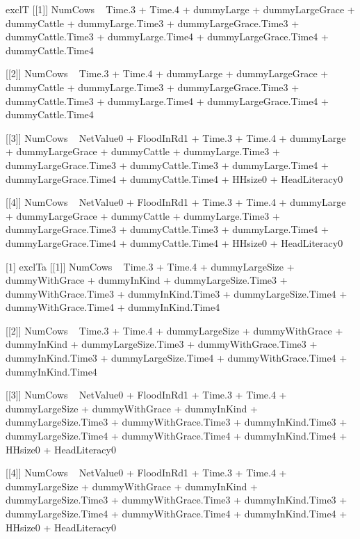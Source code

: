 \begin{Schunk}
\begin{Soutput}
[1] exclT
[[1]]
NumCows ~ Time.3 + Time.4 + dummyLarge + dummyLargeGrace + dummyCattle + 
    dummyLarge.Time3 + dummyLargeGrace.Time3 + dummyCattle.Time3 + 
    dummyLarge.Time4 + dummyLargeGrace.Time4 + dummyCattle.Time4

[[2]]
NumCows ~ Time.3 + Time.4 + dummyLarge + dummyLargeGrace + dummyCattle + 
    dummyLarge.Time3 + dummyLargeGrace.Time3 + dummyCattle.Time3 + 
    dummyLarge.Time4 + dummyLargeGrace.Time4 + dummyCattle.Time4

[[3]]
NumCows ~ NetValue0 + FloodInRd1 + Time.3 + Time.4 + dummyLarge + 
    dummyLargeGrace + dummyCattle + dummyLarge.Time3 + dummyLargeGrace.Time3 + 
    dummyCattle.Time3 + dummyLarge.Time4 + dummyLargeGrace.Time4 + 
    dummyCattle.Time4 + HHsize0 + HeadLiteracy0

[[4]]
NumCows ~ NetValue0 + FloodInRd1 + Time.3 + Time.4 + dummyLarge + 
    dummyLargeGrace + dummyCattle + dummyLarge.Time3 + dummyLargeGrace.Time3 + 
    dummyCattle.Time3 + dummyLarge.Time4 + dummyLargeGrace.Time4 + 
    dummyCattle.Time4 + HHsize0 + HeadLiteracy0

[1] exclTa
[[1]]
NumCows ~ Time.3 + Time.4 + dummyLargeSize + dummyWithGrace + 
    dummyInKind + dummyLargeSize.Time3 + dummyWithGrace.Time3 + 
    dummyInKind.Time3 + dummyLargeSize.Time4 + dummyWithGrace.Time4 + 
    dummyInKind.Time4

[[2]]
NumCows ~ Time.3 + Time.4 + dummyLargeSize + dummyWithGrace + 
    dummyInKind + dummyLargeSize.Time3 + dummyWithGrace.Time3 + 
    dummyInKind.Time3 + dummyLargeSize.Time4 + dummyWithGrace.Time4 + 
    dummyInKind.Time4

[[3]]
NumCows ~ NetValue0 + FloodInRd1 + Time.3 + Time.4 + dummyLargeSize + 
    dummyWithGrace + dummyInKind + dummyLargeSize.Time3 + dummyWithGrace.Time3 + 
    dummyInKind.Time3 + dummyLargeSize.Time4 + dummyWithGrace.Time4 + 
    dummyInKind.Time4 + HHsize0 + HeadLiteracy0

[[4]]
NumCows ~ NetValue0 + FloodInRd1 + Time.3 + Time.4 + dummyLargeSize + 
    dummyWithGrace + dummyInKind + dummyLargeSize.Time3 + dummyWithGrace.Time3 + 
    dummyInKind.Time3 + dummyLargeSize.Time4 + dummyWithGrace.Time4 + 
    dummyInKind.Time4 + HHsize0 + HeadLiteracy0
\end{Soutput}
\end{Schunk}




